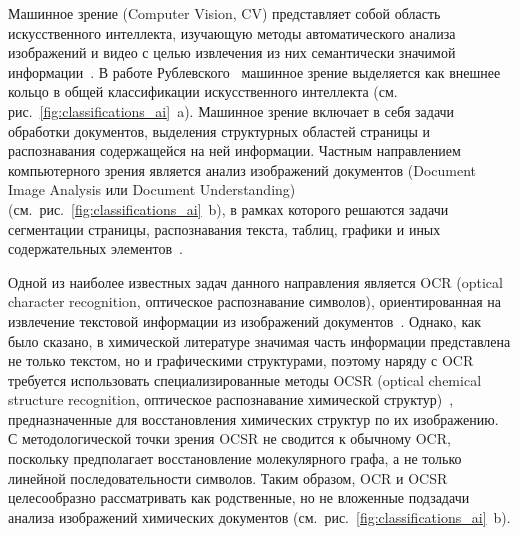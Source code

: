Машинное зрение (Computer Vision, CV) представляет собой область искусственного интеллекта, изучающую методы автоматического анализа изображений и видео с целью извлечения из них семантически значимой информации~\cite{refRakov}. В работе Рублевского~\cite{refRublevsky} машинное зрение выделяется как внешнее кольцо в общей классификации искусственного интеллекта (см. рис.~\ref{fig:classifications_ai}~a).
Машинное зрение включает в себя задачи обработки документов, выделения структурных областей страницы и распознавания содержащейся на ней информации. Частным направлением компьютерного зрения является анализ изображений документов (Document Image Analysis или Document Understanding)(см.~рис.~\ref{fig:classifications_ai}~b), в рамках которого решаются задачи сегментации страницы, распознавания текста, таблиц, графики и иных содержательных элементов~\cite{refLayoutParser,refLayoutLM}.

Одной из наиболее известных задач данного направления является OCR (optical character recognition, оптическое распознавание символов), ориентированная на извлечение текстовой информации из изображений документов~\cite{refOCRMetrics}. Однако, как было сказано, в химической литературе значимая часть информации представлена не только текстом, но и графическими структурами, поэтому наряду с OCR требуется использовать специализированные методы OCSR (optical chemical structure recognition, оптическое распознавание химической структур)~\cite{refWikiOCSR}, предназначенные для восстановления химических структур по их изображению. С методологической точки зрения OCSR не сводится к обычному OCR, поскольку предполагает восстановление молекулярного графа, а не только линейной последовательности символов. Таким образом, OCR и OCSR целесообразно рассматривать как родственные, но не вложенные подзадачи анализа изображений химических документов (см.~рис.~\ref{fig:classifications_ai}~b).